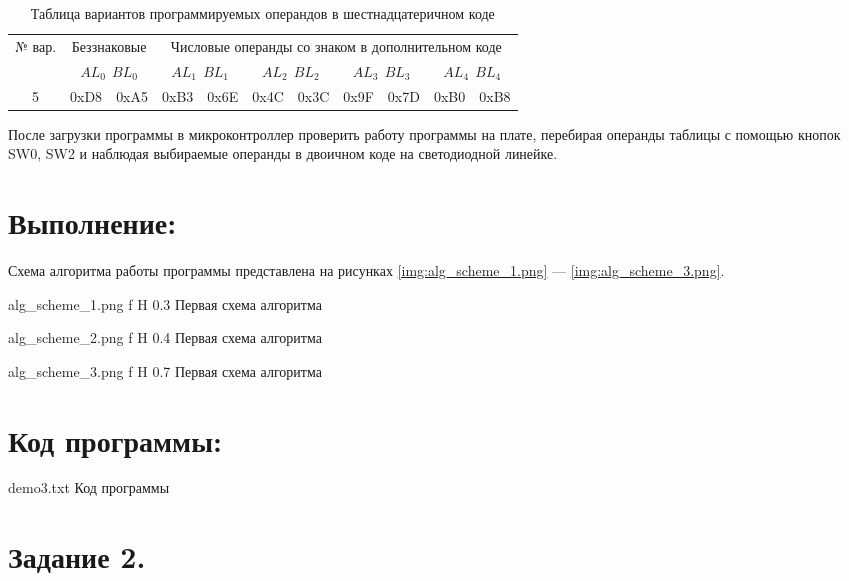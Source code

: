 \documentclass{bmstu}
\begin{document}
\begin{center}
\begin{table}[H]
\caption{Таблица вариантов программируемых операндов в шестнадцатеричном коде}
\label{table:var_table}
\begin{tabular}{| c | c | c | c | c | c | c | c | c | c | c |}
	\hline
	\multirow{2}{4em}{№ вар.}&\multicolumn{2}{|c|}{Беззнаковые}& \multicolumn{8}{|c|}{Числовые операнды со знаком в дополнительном коде} \\
	\cline{2-11}
	& \multicolumn{2}{|c|}{$AL_0~~BL_0$} & \multicolumn{2}{|c|}{$AL_1~~BL_1$} &  \multicolumn{2}{|c|}{$AL_2~~BL_2$}
		& \multicolumn{2}{|c|}{$AL_3~~BL_3$} & \multicolumn{2}{|c|}{$AL_4~~BL_4$} \\
	\hline
	5 &0xD8 & 0xA5 & 0xB3 & 0x6E & 0x4C & 0x3C & 0x9F & 0x7D & 0xB0 & 0xB8 \\
	\hline
\end{tabular}
\end{table}
\end{center}

После загрузки программы в микроконтроллер проверить работу программы на плате, перебирая операнды таблицы с помощью кнопок SW0, SW2 и наблюдая выбираемые операнды в двоичном коде на светодиодной линейке. 

\newpage
\chapter{Выполнение:}
Схема алгоритма работы программы представлена на рисунках \ref{img:alg_scheme_1.png} --- \ref{img:alg_scheme_3.png}.

	{alg_scheme_1.png}
	{f}
	{H}
	{0.3\textwidth} %
    {Первая схема алгоритма} 

	{alg_scheme_2.png}
	{f}
	{H}
	{0.4\textwidth} %
    {Первая схема алгоритма} 
    
	{alg_scheme_3.png}
	{f}
	{H}
	{0.7\textwidth} %
    {Первая схема алгоритма} 

\chapter{Код программы:}

	{demo3.txt}
	{Код программы}

\newpage 
\chapter{Задание 2.}	
 
\end{document}
